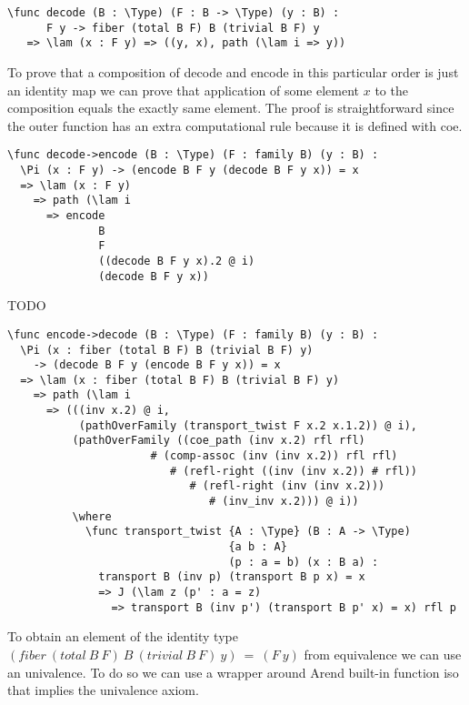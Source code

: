 \begin{ListingEnv}[H]
\begin{lstlisting}
\func decode (B : \Type) (F : B -> \Type) (y : B) :
      F y -> fiber (total B F) B (trivial B F) y
   => \lam (x : F y) => ((y, x), path (\lam i => y))
\end{lstlisting}
\end{ListingEnv}
To prove that a composition of decode and encode in this particular order is just an identity map we can prove that application of some element $x$ to the composition equals the exactly same element. The proof is straightforward since the outer function has an extra computational rule because it is defined with coe.
\begin{ListingEnv}[H]
\begin{lstlisting}
\func decode->encode (B : \Type) (F : family B) (y : B) :
  \Pi (x : F y) -> (encode B F y (decode B F y x)) = x
  => \lam (x : F y)
    => path (\lam i
      => encode
              B
              F
              ((decode B F y x).2 @ i)
              (decode B F y x))
\end{lstlisting}
\end{ListingEnv}
TODO
\begin{ListingEnv}[H]
\begin{lstlisting}
\func encode->decode (B : \Type) (F : family B) (y : B) :
  \Pi (x : fiber (total B F) B (trivial B F) y)
    -> (decode B F y (encode B F y x)) = x
  => \lam (x : fiber (total B F) B (trivial B F) y)
    => path (\lam i
      => (((inv x.2) @ i,
           (pathOverFamily (transport_twist F x.2 x.1.2)) @ i),
          (pathOverFamily ((coe_path (inv x.2) rfl rfl)
                      # (comp-assoc (inv (inv x.2)) rfl rfl)
                         # (refl-right ((inv (inv x.2)) # rfl))
                            # (refl-right (inv (inv x.2)))
                               # (inv_inv x.2))) @ i))
          \where
            \func transport_twist {A : \Type} (B : A -> \Type)
                                  {a b : A}
                                  (p : a = b) (x : B a) :
              transport B (inv p) (transport B p x) = x
              => J (\lam z (p' : a = z)
                => transport B (inv p') (transport B p' x) = x) rfl p
\end{lstlisting}
\end{ListingEnv}
To obtain an element of the identity type $(fiber\ (total\ B\ F)\ B\ (trivial\ B\ F)\ y)\ =\ (F\ y)$ from equivalence we can use an univalence. To do so we can use a wrapper around Arend built-in function iso that implies the univalence axiom.
